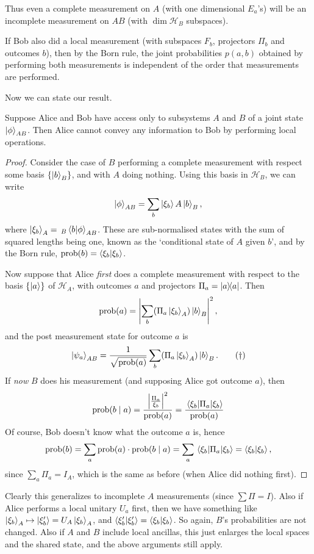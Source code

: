 \documentclass[a4paper]{article}
\begin{document}
Thus even a complete measurement on $A$ (with one dimensional $E_a$'s) will be an incomplete measurement on $AB$ (with $\operatorname{dim} \mathcal{H}_B$ subspaces).

If Bob also did a local measurement (with subspaces $F_b$, projectors $\Pi_b$ and outcomes $b$), then by the Born rule, the joint probabilities $p(a, b)$ obtained by performing both measurements is independent of the order that measurements are performed.

Now we can state our result.

\begin{theorem}
Suppose Alice and Bob have access only to subsystems $A$ and $B$ of a joint state $\ket{\phi}_{AB}$. Then Alice cannot convey any information to Bob by performing local operations.	
\end{theorem}
\begin{proof}
	Consider the case of $B$ performing a complete measurement with respect some basis $\{\ket{b}_B\}$, and with $A$ doing nothing.
	Using this basis in $\mathcal{H}_B$, we can write
	$$
	\ket{\phi}_{AB} = \sum_b \ket{\xi_b}A \ket{b}_B,
	$$
	where $\ket{\xi_b}_A = \,_B \ip{b}{\phi}_{AB}$.
	These are sub-normalised states with the sum of squared lengths being one, known as the `conditional state of $A$ given $b$',
	and by the Born rule, $\operatorname{prob}(b) = \ip{\xi_b}{\xi_b}$.

	Now suppose that Alice \emph{first} does a complete measurement with respect to the basis $\{\ket{a}\}$ of $\mathcal{H}_A$, with outcomes $a$ and projectors $\Pi_a = \dyad{a}$. Then 
	$$
	\operatorname{prob}(a) = \left|\sum_b (\Pi_a\ket{\xi_b}_A) \ket{b}_B\right|^2,
	$$
	and the post measurement state for outcome $a$ is
	\begin{equation}\label{eq:poststate}
		\ket{\psi_a}_{AB} = \frac{1}{\sqrt{\operatorname{prob}(a)}} \sum_b (\Pi_a \ket{\xi_b}_A) \ket{b}_B.\tag{$\dagger$}
	\end{equation}
	If \emph{now} $B$ does his measurement (and supposing Alice got outcome $a$), then
	$$
	\operatorname{prob}(b \mid a) = \frac{\left|\frac{\Pi_a}{\xi_b}\right|^2}{\operatorname{prob}(a)} = \frac{\ev{\Pi_a}{\xi_b}}{\operatorname{prob}(a)}
	$$
	Of course, Bob doesn't know what the outcome $a$ is, hence
	$$
	\operatorname{prob}(b) = \sum_a \operatorname{prob}(a) \cdot \operatorname{prob}(b \mid a)  = \sum_a \ev{\Pi_a}{\xi_b} = \ip{\xi_b}{\xi_b},
	$$
	since $\sum_a \Pi_a = I_A$, which is the same as before (when Alice did nothing first).
\end{proof}

\begin{remark}
	Clearly this generalizes to incomplete $A$ measurements (since $\sum \Pi = I$). Also if Alice performs a local unitary $U_a$ first, then we have something like $\ket{\xi_b}_A \mapsto \ket{\xi_b'} = U_A\ket{\xi_b}_A$, and $\ip{\xi_b'}{\xi_b'} = \ip{\xi_b}{\xi_b}$. So again, $B$'s probabilities are not changed.
	Also if $A$ and $B$ include local ancillas, this just enlarges the local spaces and the shared state, and the above arguments still apply.
\end{remark}
\end{document}

